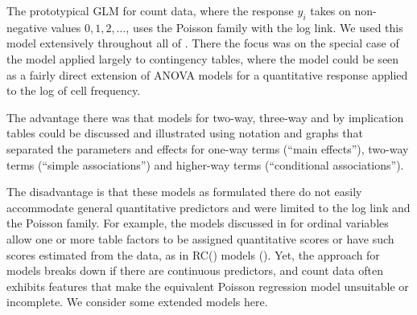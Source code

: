 \documentclass[11pt]{book}\usepackage[]{graphicx}\usepackage[]{color}
\begin{document}

The prototypical GLM for count data, where the response $y_i$
takes on non-negative values $0, 1, 2, \dots$, 
uses the Poisson family with the log link.
We used this model extensively throughout all of .
There the focus was on the special case of the \loglin model
applied largely to contingency tables, where the \loglin model could
be seen as a fairly direct extension of ANOVA models for a 
quantitative response applied to the log of cell frequency.

The advantage there was that models for two-way, three-way and 
by implication \nway tables could be discussed and illustrated
using notation and graphs that separated the parameters and
effects for one-way terms (``main effects''), two-way terms
(``simple associations'') and higher-way terms (``conditional associations'').

The disadvantage is that these models as formulated there do not
easily accommodate general quantitative predictors and
were limited to the log link and the Poisson family.
For example, the models discussed in 
for ordinal variables allow one or more table factors to be
assigned quantitative scores or have such scores estimated from
the data, as in RC() models ().
Yet, the \ctab approach for \loglin models breaks down if there are
continuous predictors, and count data often exhibits features that
make the equivalent Poisson regression model unsuitable or incomplete.
We consider some extended models here.
\end{document}
